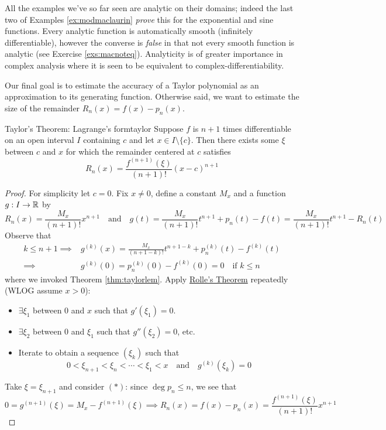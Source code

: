 All the examples we've so far seen are analytic on their domains; indeed the last two of Examples \ref{ex:modmaclaurin} \emph{prove} this for the exponential and sine functions. Every analytic function is automatically smooth (infinitely differentiable), however the converse is \emph{false} in that not every smooth function is analytic (see Exercise \ref{exs:macnoteq}). Analyticity is of greater importance in complex analysis where it is seen to be equivalent to complex-differentiability.


Our final goal is to estimate the accuracy of a Taylor polynomial as an approximation to its generating function. Otherwise said, we want to estimate the size of the remainder $R_n(x)=f(x)-p_n(x)$.

\begin{thm}{Taylor's Theorem: Lagrange's form}{taylor}
Suppose $f$ is $n+1$ times differentiable on an open interval $I$ containing $c$ and let $x\in I\setminus\{c\}$. Then there exists some $\xi$ between $c$ and $x$ for which the remainder centered at $c$ satisfies
\[R_n(x)=\frac{f^{(n+1)}(\xi)}{(n+1)!}(x-c)^{n+1}\] 
\end{thm}

\begin{proof}
For simplicity let $c=0$. Fix $x\neq 0$, define a constant $M_x$ and a function $g:I\to\mathbb{R}$ by
\[R_n(x)=\frac{M_x}{(n+1)!}x^{n+1}\quad\text{and}\quad g(t)=\frac{M_x}{(n+1)!}t^{n+1}+p_{n}(t)-f(t) = \frac{M_x}{(n+1)!}t^{n+1}-R_{n}(t)\]
Observe that
\begin{align*}
k\le n+1\implies &g^{(k)}(x)=\frac{M_x}{(n+1-k)!}t^{n+1-k}+p^{(k)}_n(t)-f^{(k)}(t)\tag{$\ast$}\\
\implies &g^{(k)}(0)=
p^{(k)}_n(0)-f^{(k)}(0) =0\quad \text{if $k\le n$}%
\end{align*}
where we invoked Theorem \ref{thm:taylorlem}.\smallbreak
Apply \hyperref[lemm:rolle]{Rolle's Theorem} repeatedly (WLOG assume $x>0$):
\begin{itemize}
  \item $\exists\xi_1$ between 0 and $x$ such that $g'(\xi_1)=0$.
  \item $\exists\xi_2$ between 0 and $\xi_1$ such that $g''(\xi_2)=0$, etc.
  \item Iterate to obtain a sequence $(\xi_k)$ such that
  \[0<\xi_{n+1}<\xi_n<\cdots <\xi_1<x\quad\text{and}\quad g^{(k)}(\xi_k)=0\]
\end{itemize}
Take $\xi=\xi_{n+1}$ and consider $(\ast)$: since $\operatorname{deg}p_n\le n$, we see that
\[0=g^{(n+1)}(\xi)=M_x-f^{(n+1)}(\xi) \implies R_n(x)=f(x)-p_n(x)=\frac{f^{(n+1)}(\xi)}{(n+1)!}x^{n+1}\tag*{\qedhere}\]
\end{proof}


